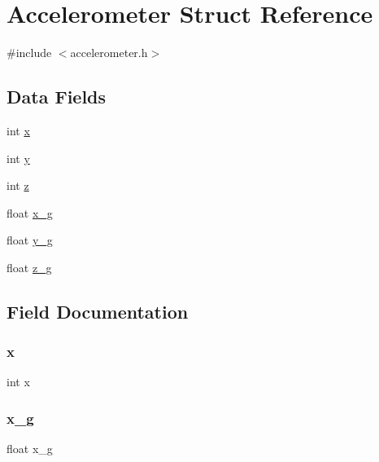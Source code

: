\hypertarget{struct_accelerometer}{}\section{Accelerometer Struct Reference}
\label{struct_accelerometer}


{\ttfamily \#include $<$accelerometer.\+h$>$}

\subsection*{Data Fields}
\begin{DoxyCompactItemize}
\item 
int \hyperlink{struct_accelerometer_a6150e0515f7202e2fb518f7206ed97dc}{x}
\item 
int \hyperlink{struct_accelerometer_a0a2f84ed7838f07779ae24c5a9086d33}{y}
\item 
int \hyperlink{struct_accelerometer_a14f94e529dff0b8bfba8e16fbe9755d6}{z}
\item 
float \hyperlink{struct_accelerometer_abd786e713d0e5b6032ead58fe3a50f22}{x\+\_\+g}
\item 
float \hyperlink{struct_accelerometer_ab11512e7ca34d654b9ea6430d9622a02}{y\+\_\+g}
\item 
float \hyperlink{struct_accelerometer_a73297a617ca96ab3e653f03c179e866c}{z\+\_\+g}
\end{DoxyCompactItemize}


\subsection{Field Documentation}
\mbox{\label{struct_accelerometer_a6150e0515f7202e2fb518f7206ed97dc}} 
\subsubsection{\texorpdfstring{x}{x}}
{\footnotesize\ttfamily int x}

\mbox{\label{struct_accelerometer_abd786e713d0e5b6032ead58fe3a50f22}} 
\subsubsection{\texorpdfstring{x\+\_\+g}{x\_g}}
{\footnotesize\ttfamily float x\+\_\+g}

